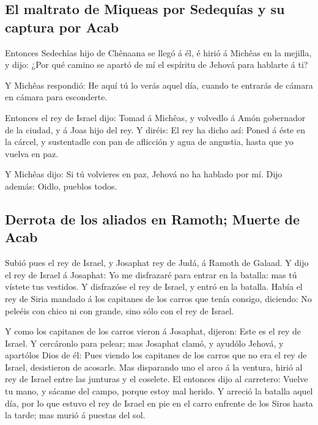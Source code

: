 \hypertarget{el-maltrato-de-miqueas-por-sedequuxedas-y-su-captura-por-acab}{%
\subsection{El maltrato de Miqueas por Sedequías y su captura por
Acab}\label{el-maltrato-de-miqueas-por-sedequuxedas-y-su-captura-por-acab}}

 Entonces Sedechîas hijo de Chênaana se llegó á él, é
hirió á Michêas en la mejilla, y dijo: ¿Por qué camino se apartó de mí
el espíritu de Jehová para hablarte á ti?

 Y Michêas respondió: He aquí tú lo verás aquel día,
cuando te entrarás de cámara en cámara para esconderte.

 Entonces el rey de Israel dijo: Tomad á Michêas, y
volvedlo á Amón gobernador de la ciudad, y á Joas hijo del rey.
 Y diréis: El rey ha dicho así: Poned á éste en la
cárcel, y sustentadle con pan de aflicción y agua de angustia, hasta que
yo vuelva en paz.

 Y Michêas dijo: Si tú volvieres en paz, Jehová no ha
hablado por mí. Dijo además: Oidlo, pueblos todos.

\hypertarget{derrota-de-los-aliados-en-ramoth-muerte-de-acab}{%
\subsection{Derrota de los aliados en Ramoth; Muerte de
Acab}\label{derrota-de-los-aliados-en-ramoth-muerte-de-acab}}

 Subió pues el rey de Israel, y Josaphat rey de Judá, á
Ramoth de Galaad.  Y dijo el rey de Israel á Josaphat: Yo
me disfrazaré para entrar en la batalla: mas tú vístete tus vestidos. Y
disfrazóse el rey de Israel, y entró en la batalla. 
Había el rey de Siria mandado á los capitanes de los carros que tenía
consigo, diciendo: No peleéis con chico ni con grande, sino sólo con el
rey de Israel.

 Y como los capitanes de los carros vieron á Josaphat,
dijeron: Este es el rey de Israel. Y cercáronlo para pelear; mas
Josaphat clamó, y ayudólo Jehová, y apartólos Dios de él:
 Pues viendo los capitanes de los carros que no era el
rey de Israel, desistieron de acosarle.  Mas disparando
uno el arco á la ventura, hirió al rey de Israel entre las junturas y el
coselete. El entonces dijo al carretero: Vuelve tu mano, y sácame del
campo, porque estoy mal herido.  Y arreció la batalla
aquel día, por lo que estuvo el rey de Israel en pie en el carro
enfrente de los Siros hasta la tarde; mas murió á puestas del sol.

